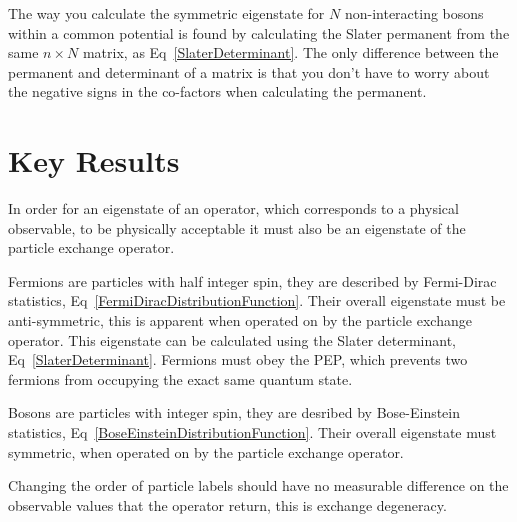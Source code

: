 \noindent The way you calculate the symmetric eigenstate for $N$ non-interacting bosons within a common potential is found by calculating the Slater permanent from the same $n \times N$ matrix, as Eq~\ref{SlaterDeterminant}. The only difference between the permanent and determinant of a matrix is that you don't have to worry about the negative signs in the co-factors when calculating the permanent.

\section{Key Results}

In order for an eigenstate of an operator, which corresponds to a physical observable, to be physically acceptable it must also be an eigenstate of the particle exchange operator.

\noindent Fermions are particles with half integer spin, they are described by Fermi-Dirac statistics, Eq~\ref{FermiDiracDistributionFunction}. Their overall eigenstate must be anti-symmetric, this is apparent when operated on by the particle exchange operator. This eigenstate can be calculated using the Slater determinant, Eq~\ref{SlaterDeterminant}. Fermions must obey the PEP, which prevents two fermions from occupying the exact same quantum state.

\noindent Bosons are particles with integer spin, they are desribed by Bose-Einstein statistics, Eq~\ref{BoseEinsteinDistributionFunction}. Their overall eigenstate must symmetric, when operated on by the particle exchange operator.

\noindent Changing the order of particle labels should have no measurable difference on the observable values that the operator return, this is exchange degeneracy.
